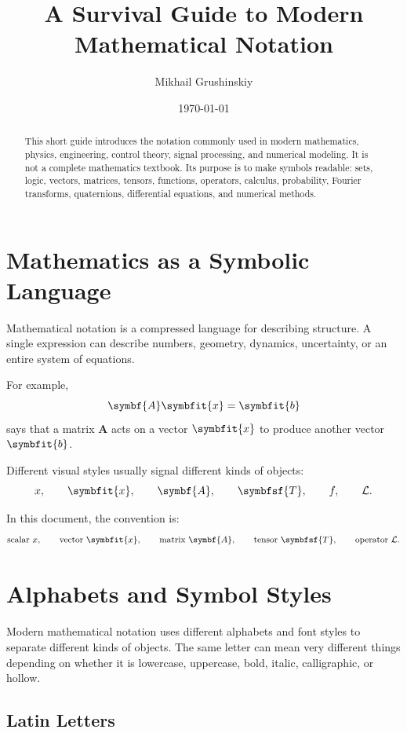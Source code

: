 \documentclass[11pt,twocolumn]{article}
\title{A Survival Guide to Modern Mathematical Notation}
\author{Mikhail Grushinskiy}
\date{\today}
\newcommand{\vct}[1]{\symbfit{#1}}   %
\newcommand{\mat}[1]{\symbf{#1}}     %
\newcommand{\ten}[1]{\symbfsf{#1}}   %
\begin{document}
\maketitle

\begin{abstract}
This short guide introduces the notation commonly used in modern mathematics,
physics, engineering, control theory, signal processing, and numerical modeling.
It is not a complete mathematics textbook. Its purpose is to make symbols
readable: sets, logic, vectors, matrices, tensors, functions, operators,
calculus, probability, Fourier transforms, quaternions, differential equations,
and numerical methods.
\end{abstract}

\section{Mathematics as a Symbolic Language}

Mathematical notation is a compressed language for describing structure.
A single expression can describe numbers, geometry, dynamics, uncertainty,
or an entire system of equations.

For example,
\[
\mat{A}\vct{x}=\vct{b}
\]
says that a matrix \(\mat{A}\) acts on a vector \(\vct{x}\) to produce another
vector \(\vct{b}\).

Different visual styles usually signal different kinds of objects:
\[
x,
\qquad
\vct{x},
\qquad
\mat{A},
\qquad
\ten{T},
\qquad
f,
\qquad
\mathcal{L}.
\]

In this document, the convention is:
\[
\text{scalar } x,
\qquad
\text{vector } \vct{x},
\qquad
\text{matrix } \mat{A},
\qquad
\text{tensor } \ten{T},
\qquad
\text{operator } \mathcal{L}.
\]

\section{Alphabets and Symbol Styles}

Modern mathematical notation uses different alphabets and font styles to
separate different kinds of objects. The same letter can mean very different
things depending on whether it is lowercase, uppercase, bold, italic,
calligraphic, or hollow.

\subsection{Latin Letters}
\end{document}
